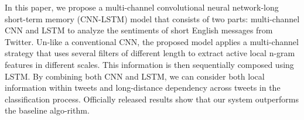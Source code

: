 In this paper, we propose a multi-channel convolutional neural network-long short-term memory (CNN-LSTM) model that consists of two parts: multi-channel CNN and LSTM to analyze the sentiments of short English messages from Twitter. Un-like a conventional CNN, the proposed model applies a multi-channel strategy that uses several filters of different length to extract active local n-gram features in different scales. This information is then sequentially composed using LSTM. By combining both CNN and LSTM, we can consider both local information within tweets and long-distance dependency across tweets in the classification process. Officially released results show that our system outperforms the baseline algo-rithm.
